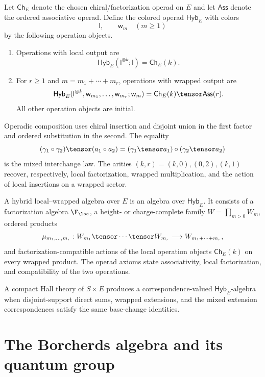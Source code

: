 \begin{definition}
Let $\mathsf{Ch}_E$ denote the chosen chiral/factorization operad on $E$ and let $\mathsf{Ass}$ denote the ordered associative operad. Define the colored operad $\mathsf{Hyb}_E$ with colors
\[
 \mathsf l,\qquad \mathsf w_m\quad(m\ge1)
\]
by the following operation objects.
\begin{enumerate}
\item Operations with local output are
\[
 \mathsf{Hyb}_E(\mathsf l^{\otimes k};\mathsf l)=\mathsf{Ch}_E(k).
\]
\item For $r\ge1$ and $m=m_1+\cdots+m_r$, operations with wrapped output are
\[
 \mathsf{Hyb}_E
 (\mathsf l^{\otimes k},\mathsf w_{m_1},\ldots,\mathsf w_{m_r};\mathsf w_m)
 =\mathsf{Ch}_E(k)\tensor\mathsf{Ass}(r).
\]
All other operation objects are initial.
\end{enumerate}
Operadic composition uses chiral insertion and disjoint union in the first factor and ordered substitution in the second. The equality
\[
 (\gamma_1\circ\gamma_2)\tensor(a_1\circ a_2)
 = (\gamma_1\tensor a_1)\circ(\gamma_2\tensor a_2)
\]
is the mixed interchange law. The arities $(k,r)=(k,0),(0,2),(k,1)$ recover, respectively, local factorization, wrapped multiplication, and the action of local insertions on a wrapped sector.
\end{definition}

\begin{definition}
A hybrid local--wrapped algebra over $E$ is an algebra over $\mathsf{Hyb}_E$. It consists of a factorization algebra $\F_{\loc}$, a height- or charge-complete family $W=\prod_{m>0}W_m$, ordered products
\[
 \mu_{m_1,\ldots,m_r}:W_{m_1}\tensor\cdots\tensor W_{m_r}
 \longrightarrow W_{m_1+\cdots+m_r},
\]
and factorization-compatible actions of the local operation objects $\mathsf{Ch}_E(k)$ on every wrapped product. The operad axioms state associativity, local factorization, and compatibility of the two operations.
\end{definition}

A compact Hall theory of $S\times E$ produces a correspondence-valued $\mathsf{Hyb}_E$-algebra when disjoint-support direct sums, wrapped extensions, and the mixed extension correspondences satisfy the same base-change identities.


\part{The Borcherds algebra and its quantum group}

